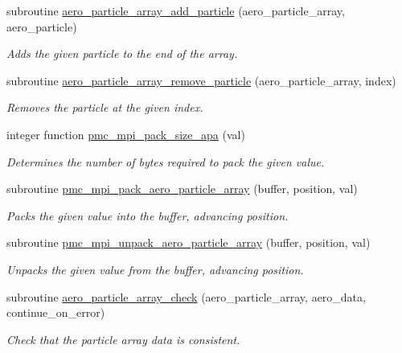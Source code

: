 \begin{DoxyCompactItemize}
subroutine \mbox{\hyperlink{namespacepmc__aero__particle__array_ab73b42afceadd849d5ec2764a00f352b}{aero\+\_\+particle\+\_\+array\+\_\+add\+\_\+particle}} (aero\+\_\+particle\+\_\+array, aero\+\_\+particle)
\begin{DoxyCompactList}\small\item\em Adds the given particle to the end of the array. \end{DoxyCompactList}\item 
subroutine \mbox{\hyperlink{namespacepmc__aero__particle__array_ae9235097ccd6e404376698476935f1d8}{aero\+\_\+particle\+\_\+array\+\_\+remove\+\_\+particle}} (aero\+\_\+particle\+\_\+array, index)
\begin{DoxyCompactList}\small\item\em Removes the particle at the given index. \end{DoxyCompactList}\item 
integer function \mbox{\hyperlink{namespacepmc__aero__particle__array_a290d3188932591b977cef41dd912a335}{pmc\+\_\+mpi\+\_\+pack\+\_\+size\+\_\+apa}} (val)
\begin{DoxyCompactList}\small\item\em Determines the number of bytes required to pack the given value. \end{DoxyCompactList}\item 
subroutine \mbox{\hyperlink{namespacepmc__aero__particle__array_a5a1cb513ef2be5a52af19464a8a17a3f}{pmc\+\_\+mpi\+\_\+pack\+\_\+aero\+\_\+particle\+\_\+array}} (buffer, position, val)
\begin{DoxyCompactList}\small\item\em Packs the given value into the buffer, advancing position. \end{DoxyCompactList}\item 
subroutine \mbox{\hyperlink{namespacepmc__aero__particle__array_a291741b0c1a43833d01c1e90fce5848b}{pmc\+\_\+mpi\+\_\+unpack\+\_\+aero\+\_\+particle\+\_\+array}} (buffer, position, val)
\begin{DoxyCompactList}\small\item\em Unpacks the given value from the buffer, advancing position. \end{DoxyCompactList}\item 
subroutine \mbox{\hyperlink{namespacepmc__aero__particle__array_a6f4a60d073f866cb41a593de26778dd3}{aero\+\_\+particle\+\_\+array\+\_\+check}} (aero\+\_\+particle\+\_\+array, aero\+\_\+data, continue\+\_\+on\+\_\+error)
\begin{DoxyCompactList}\small\item\em Check that the particle array data is consistent. \end{DoxyCompactList}\end{DoxyCompactItemize}



